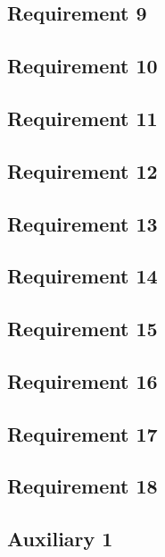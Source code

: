\documentclass[a4paper]{article}
\begin{document}
    \subsection{Requirement 9}
    

    \subsection{Requirement 10}
    

    \subsection{Requirement 11}
    

    \subsection{Requirement 12}
    

    \subsection{Requirement 13}
    

    \subsection{Requirement 14}
    

    \subsection{Requirement 15}
    

    \subsection{Requirement 16}
    

    \subsection{Requirement 17}
    

    \subsection{Requirement 18}
    
    
    \subsection{Auxiliary 1}\label{sec:aux1}
    
\end{document}
